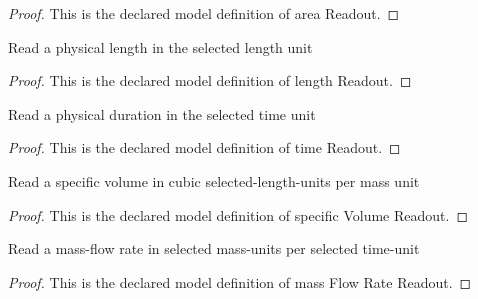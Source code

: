 \begin{proof}
  This is the declared model definition of area Readout.
\end{proof}
\begin{definition}
  \label{def:physics:phyx-mini-0445:phyxminiproblems-problemphyxmini0445-lengthreadout}
  Read a physical length in the selected length unit
\end{definition}
\begin{proof}
  This is the declared model definition of length Readout.
\end{proof}
\begin{definition}
  \label{def:physics:phyx-mini-0445:phyxminiproblems-problemphyxmini0445-timereadout}
  Read a physical duration in the selected time unit
\end{definition}
\begin{proof}
  This is the declared model definition of time Readout.
\end{proof}
\begin{definition}
  \label{def:physics:phyx-mini-0445:phyxminiproblems-problemphyxmini0445-specificvolumereadout}
  Read a specific volume in cubic selected-length-units per mass unit
\end{definition}
\begin{proof}
  This is the declared model definition of specific Volume Readout.
\end{proof}
\begin{definition}
  \label{def:physics:phyx-mini-0445:phyxminiproblems-problemphyxmini0445-massflowratereadout}
  Read a mass-flow rate in selected mass-units per selected time-unit
\end{definition}
\begin{proof}
  This is the declared model definition of mass Flow Rate Readout.
\end{proof}
